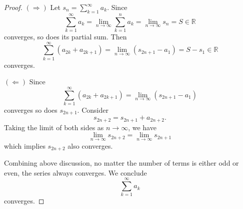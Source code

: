 \documentclass{report}
\begin{document}
\setcounter{Exercise}{8}
\vspace{12pt}
\begin{Exercise}
\begin{proof}
$(\Longrightarrow)$
Let $s_n = \sum_{k=1}^{\infty}a_k$. Since $$\sum_{k=1}^{\infty}a_k = \lim_{n\to\infty}\sum_{k=1}^{n}a_k = \lim_{n\to\infty}s_n = S \in \mathbb{R}$$
converges, so does its partial sum. Then $$\sum_{k=1}^{\infty}(a_{2k}+a_{2k+1}) = \lim_{n\to\infty}(s_{2n+1}-a_1) = S-s_1 \in \mathbb{R}$$ converges. 

\vspace{2ex}

$(\Longleftarrow)$ Since  $$\sum_{k=1}^{\infty}(a_{2k}+a_{2k+1}) = \lim_{n\to\infty}(s_{2n+1}-a_1)$$ converges so does $s_{2n+1}$. Consider $$s_{2n+2} = s_{2n+1}+a_{2n+2}.$$
Taking the limit of both sides as $n\to\infty$, we have $$\lim_{n\to\infty}s_{2n+2} = \lim_{n\to\infty}s_{2n+1}$$
which implies $s_{2n+2}$ also converges.

\vspace{1ex}

Combining above discussion, no matter the number of terms is either odd or even, the series always converges. We conclude $$ \sum_{k=1}^{\infty}a_k$$ converges.
\end{proof}
\end{Exercise}
\end{document}
